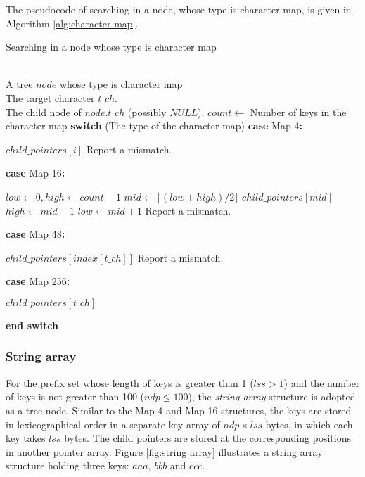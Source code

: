 \documentclass{article}
\makeatletter
\newcommand{\SWITCH}[1]{\STATE \textbf{switch} (#1)}
\newcommand{\ENDPWITCH}{\STATE \textbf{end switch}}
\newcommand{\CASE}[1]{\STATE \textbf{case} #1\textbf{:} \begin{ALC@g}}
\newcommand{\ENDCASE}{\end{ALC@g}}
\makeatother
\begin{document}
The pseudocode of searching in a node, whose type is character map, is
given in Algorithm \ref{alg:character map}.

\begin{algorithm}
  \caption{Searching in a node whose type is character map}\scriptsize
  \label{alg:character map}
  \begin{algorithmic}[1]
    \REQUIRE ~~\\
    A tree $node$ whose type is character map\\
    The target character $t\_ch$.
    \ENSURE ~~\\
    The child node of $node.t\_ch$ (possibly $NULL$).
    \STATE
    \STATE $count \leftarrow$ Number of keys in the character map
    \STATE
    \SWITCH{The type of the character map}
    \CASE{\textsf{Map 4}}
    \RETURN $child\_pointers[i]$
    \ENDIF
    \ENDFOR
    \STATE Report a mismatch.
    \ENDCASE
    \STATE
    \CASE{\textsf{Map 16}}
    \STATE $low \leftarrow 0, high \leftarrow count-1$
    \STATE $mid \leftarrow \lfloor (low+high)/2 \rfloor$
    \RETURN $child\_pointers[mid]$
    \STATE $high \leftarrow mid-1$
    \ELSE
    \STATE $low \leftarrow mid+1$
    \ENDIF
    \ENDWHILE
    \STATE Report a mismatch.
    \ENDCASE
    \STATE
    \CASE{\textsf{Map 48}}
    \RETURN $child\_pointers[index[t\_ch]]$
    \ELSE
    \STATE Report a mismatch.
    \ENDIF
    \ENDCASE
    \STATE
    \CASE{\textsf{Map 256}}
    \RETURN $child\_pointers[t\_ch]$
    \ENDCASE
    \ENDPWITCH
  \end{algorithmic}
\end{algorithm}

\subsubsection{String array}
\label{sec:string array}

For the prefix set whose length of keys is greater than 1 ($lss > 1$)
and the number of keys is not greater than 100 ($ndp \leq 100$), the
\emph{string array} structure is adopted as a tree node. Similar to
the Map 4 and Map 16 structures, the keys are stored in
lexicographical order in a separate key array of $ndp \times lss$
bytes, in which each key takes $lss$ bytes. The child pointers are
stored at the corresponding positions in another pointer array. Figure
\ref{fig:string array} illustrates a string array structure holding
three keys: $aaa$, $bbb$ and $ccc$.
\end{document}

